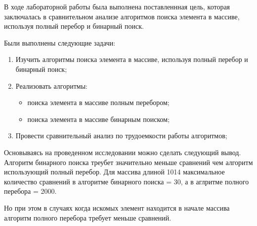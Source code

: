 

В ходе лабораторной работы была выполнена поставленнная цель, которая заключалась в сравнительном анализе алгоритмов поиска элемента в массиве, используя полный перебор и бинарный поиск.

Были выполнены следующие задачи:
\begin{enumerate}
	\item Изучить алгоритмы поиска элемента в массиве, используя полный перебор и бинарный поиск;
	\item Реализовать алгоритмы:
	\begin{itemize}[label=---]
		\item поиска элемента в массиве полным перебором;
		\item поиска элемента в массиве бинарным поиском;
	\end{itemize}
	\item Провести сравнительный анализ по трудоемкости работы алгоритмов;
\end{enumerate}


Основываясь на проведенном исследовании можно сделать следующий вывод.
Алгоритм бинарного поиска треубет значительно меньше сравнений чем алгоритм использующий полный перебор. Для массива длиной 1014 максимальное количество сравнений в алгоритме бинарного поиска = 30, а в аглритме полного перебора = 2000.

Но при этом в случаях когда искомых элемент находится в начале массива алгоритм полного перебора требует меньше сравнений.
